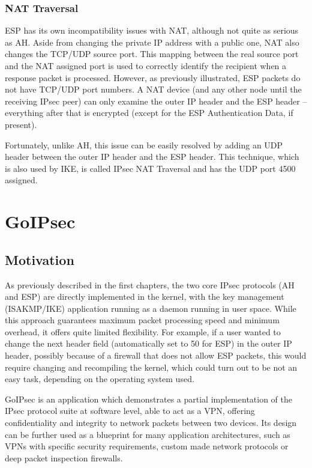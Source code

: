 \documentclass[a4paper,12pt]{report}
\begin{document}
		\subsection{NAT Traversal}
		ESP has its own incompatibility issues with NAT, although not quite as serious as AH. Aside from changing the private IP address with a public one, NAT also changes the TCP/UDP source port. This mapping between the real source port and the NAT assigned port is used to correctly identify the recipient when a response packet is processed. However, as previously illustrated, ESP packets do not have TCP/UDP port numbers. A NAT device (and any other node until the receiving IPsec peer) can only examine the outer IP header and the ESP header -- everything after that is encrypted (except for the ESP Authentication Data, if present).
		
		Fortunately, unlike AH, this issue can be easily resolved by adding an UDP header between the outer IP header and the ESP header. This technique, which is also used by IKE, is called IPsec NAT Traversal and has the UDP port 4500 assigned.
		
		\chapter{GoIPsec}
		\section{Motivation}
		As previously described in the first chapters, the two core IPsec protocols (AH and ESP) are directly implemented in the kernel, with the key management (ISAKMP/IKE) application running as a daemon running in user space. While this approach guarantees maximum packet processing speed and minimum overhead, it offers quite limited flexibility. For example, if a user wanted to change the next header field (automatically set to 50 for ESP) in the outer IP header, possibly because of a firewall that does not allow ESP packets, this would require changing and recompiling the kernel, which could turn out to be not an easy task, depending on the operating system used.
		
		GoIPsec is an application which demonstrates a partial implementation of the IPsec protocol suite at software level, able to act as a VPN, offering confidentiality and integrity to network packets between two devices. Its design can be further used as a blueprint for many application architectures, such as VPNs with specific security requirements, custom made network protocols or deep packet inspection firewalls.
		
\end{document}
